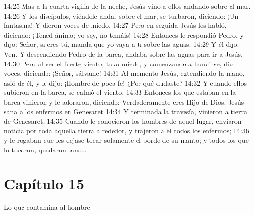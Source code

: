 14:25 Mas a la cuarta vigilia de la noche, Jesús vino a ellos andando sobre el mar. 
14:26 Y los discípulos, viéndole andar sobre el mar, se turbaron, diciendo: ¡Un fantasma! Y dieron voces de miedo. 
14:27 Pero en seguida Jesús les habló, diciendo: ¡Tened ánimo; yo soy, no temáis! 
14:28 Entonces le respondió Pedro, y dijo: Señor, si eres tú, manda que yo vaya a ti sobre las aguas. 
14:29 Y él dijo: Ven. Y descendiendo Pedro de la barca, andaba sobre las aguas para ir a Jesús. 
14:30 Pero al ver el fuerte viento, tuvo miedo; y comenzando a hundirse, dio voces, diciendo: ¡Señor, sálvame! 
14:31 Al momento Jesús, extendiendo la mano, asió de él, y le dijo: ¡Hombre de poca fe! ¿Por qué dudaste? 
14:32 Y cuando ellos subieron en la barca, se calmó el viento. 
14:33 Entonces los que estaban en la barca vinieron y le adoraron, diciendo: Verdaderamente eres Hijo de Dios. 
Jesús sana a los enfermos en Genesaret  
14:34 Y terminada la travesía, vinieron a tierra de Genesaret. 
14:35 Cuando le conocieron los hombres de aquel lugar, enviaron noticia por toda aquella tierra alrededor, y trajeron a él todos los enfermos; 
14:36 y le rogaban que les dejase tocar solamente el borde de su manto; y todos los que lo tocaron, quedaron sanos. 
\section*{Capítulo 15}
Lo que contamina al hombre  
 
